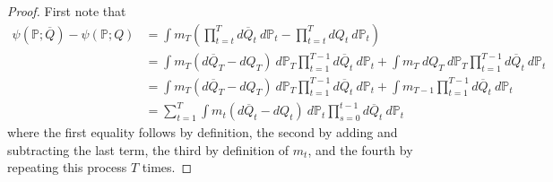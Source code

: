 \documentclass[12pt]{article}
\newcommand{\Pb}{\mathbb{P}}
\theoremstyle{remark}
\begin{document}
\begin{proof}
First note that
\begin{align*}
\psi(\Pb;\overline{Q}) - \psi(\Pb;Q)  &= \int m_T \left( \prod_{t=t}^{T} d\overline{Q}_t  \ d\Pb_t - \prod_{t=t}^{T} d{Q}_t  \ d\Pb_t \right) \\
&= \int m_T (d\overline{Q}_T - dQ_T) \ d\Pb_T \prod_{t=1}^{T-1} d\overline{Q}_t  \ d\Pb_t + \int m_T \ dQ_T \ d\Pb_T \prod_{t=1}^{T-1} d\overline{Q}_t  \ d\Pb_t \\
&= \int m_T (d\overline{Q}_T - dQ_T) \ d\Pb_T \prod_{t=1}^{T-1} d\overline{Q}_t  \ d\Pb_t + \int m_{T-1} \prod_{t=1}^{T-1} d\overline{Q}_t  \ d\Pb_t \\
&= \sum_{t=1}^T \int m_t (d\overline{Q}_t - dQ_t) \ d\Pb_t \prod_{s=0}^{t-1} d\overline{Q}_t  \ d\Pb_t
\end{align*}
where the first equality follows by definition, the second by adding and subtracting the last term, the third by definition of $m_t$, and the fourth by repeating this process $T$ times.


\end{proof}
\end{document}
